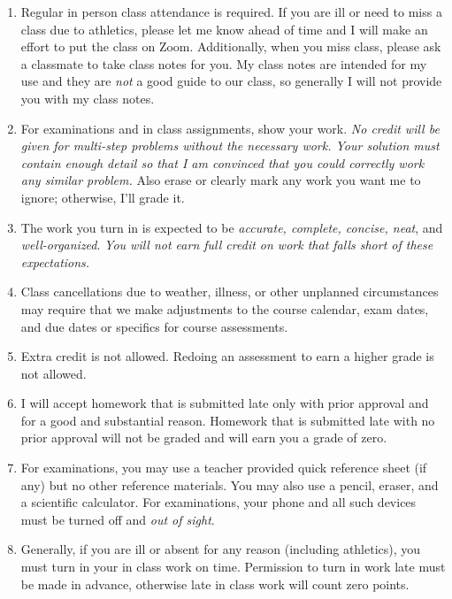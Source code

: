 \documentclass[12pt]{article}
\newcounter{ex}\setcounter{ex}{0}
\begin{document}
\begin{enumerate}

\item Regular in person class attendance is required. If you are ill or need to miss a 
class due to athletics, please let me know ahead of time and I will make an effort to put the class on Zoom. Additionally,
when you miss class, please ask a classmate to take class notes for you.  My class notes are intended for my use and they are \emph{not} a good guide to our class, so generally I will not provide you with my class notes. 

\item For examinations and in class assignments, show your work.  \emph{No credit will be given for multi-step problems without the necessary work. Your solution must contain enough detail
so that I am convinced that you could correctly work any similar problem.} Also erase or clearly mark any work you want me to ignore; otherwise,
I'll grade it.  

\item The work you turn in is expected to be \emph{accurate, 
complete, concise, neat}, and \emph{well-organized}.  
\emph{You will not earn full credit on work that falls short of 
these expectations.}

\item Class cancellations due to weather, illness, or other 
unplanned circumstances may require that we make  adjustments
to the course calendar, exam dates, and due dates or specifics for 
course assessments. 


\item Extra credit is not allowed. Redoing an assessment to earn a higher grade is not allowed.

\item I will accept homework that is submitted late only with prior approval and for a good and substantial reason. Homework 
that is submitted late with no prior approval will not be graded and will earn you a grade of zero.

\item For examinations, you may use a teacher provided quick reference sheet (if any)
but no other reference materials.  You may also use a pencil, eraser, 
and a scientific calculator. For examinations, your phone and all such
devices must be turned off and \emph{out of sight}. 

\item Generally, if you are ill or absent for any reason (including 
athletics), you must turn in your in class work on time. Permission to
turn in work late must be made in advance, otherwise late in class work 
will count zero points.



\end{enumerate}
\end{document}

